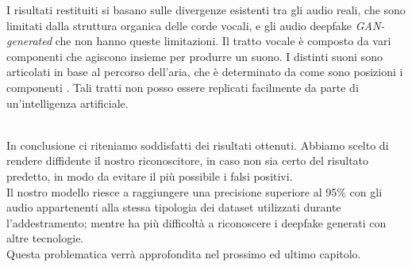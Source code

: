 \documentclass[12pt, a4paper]{article}
\begin{document}
\begin{minipage}{0.6\textwidth}
I risultati restituiti si basano sulle divergenze esistenti tra gli audio reali, che sono limitati dalla struttura organica delle corde vocali, e gli audio deepfake \textit{GAN-generated} che non hanno queste limitazioni. Il tratto vocale è composto da vari componenti che agiscono insieme per produrre un suono. I distinti suoni sono articolati in base al percorso dell'aria, che è determinato da come sono posizioni i componenti \cite{280020}. Tali tratti non posso essere replicati facilmente da parte di un'intelligenza artificiale.\\
\end{minipage}
\\
In conclusione ci riteniamo soddisfatti dei risultati ottenuti. Abbiamo scelto di rendere diffidente il nostro riconoscitore, in caso non sia certo del risultato predetto, in modo da evitare il più possibile i falsi positivi.\\ 
Il nostro modello riesce a raggiungere una precisione superiore al 95\% con gli audio appartenenti alla stessa tipologia dei dataset utilizzati durante l'addestramento; mentre ha più difficoltà a riconoscere i deepfake generati con altre tecnologie.\\
Questa problematica verrà approfondita nel prossimo ed ultimo capitolo.
\newpage
\end{document}
